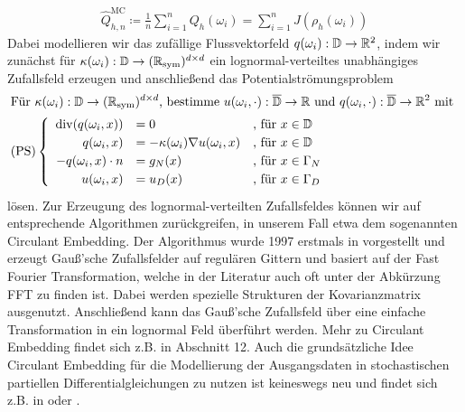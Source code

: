\begin{align}
	\label{MC-Schätzer}
	\widehat{Q}_{h,n}^{\text{MC}} \coloneqq \frac{1}{n} \sum_{i=1}^{n} Q_h(\omega_i) = \sum_{i=1}^{n} J(\rho_h(\omega_i))
\end{align}
Dabei modellieren wir das zufällige Flussvektorfeld $ q(\omega_i)  : \mathbb{D} \to \mathbb{R}^2 $, indem wir zunächst für $ \kappa(\omega_i) : \mathbb{D} \rightarrow (\mathbb{R}_{\text{sym}})^{d \times d} $ ein lognormal-verteiltes unabhängiges Zufallsfeld erzeugen und anschließend das Potentialströmungsproblem
\begin{align*}
\setlength\arraycolsep{1pt}
&\text{Für } \kappa(\omega_i) : \mathbb{D} \rightarrow (\R_{\text{sym}})^{d \times d} \text{, bestimme } u(\omega_i,\cdot):\overline{\mathbb{D}} \to \R \text{ und } q(\omega_i, \cdot): \overline{\mathbb{D}} \to \R^2 \text{ mit } \\
&\text{(PS)}
\begin{cases}
\begin{array}{rlll}
\dive (q(\omega_i,x)) &= 0  &\text{, für } x \in \mathbb{ D}\\  
q(\omega_i,x) &= - \kappa(\omega_i) \nabla u(\omega_i,x)  &\text{, für } x \in \mathbb{D}\\
-q(\omega_i,x) \cdot n &= g_N(x)  &\text{, für } x \in \Gamma_N \\
u(\omega_i,x) &= u_D(x)  &\text{, für } x \in \Gamma_D \\
\end{array}
\end{cases} \\
\end{align*}
lösen. Zur Erzeugung des lognormal-verteilten Zufallsfeldes können wir auf entsprechende Algorithmen zurückgreifen, in unserem Fall etwa dem sogenannten Circulant Embedding.
Der Algorithmus wurde 1997 erstmals in \cite{dietrich1997fast} vorgestellt und 
erzeugt Gauß'sche Zufallsfelder auf regulären Gittern und basiert auf der Fast Fourier Transformation, welche in der Literatur auch oft unter der Abkürzung FFT zu finden ist.
Dabei werden spezielle Strukturen der Kovarianzmatrix ausgenutzt. Anschließend kann das Gauß'sche Zufallsfeld über eine einfache Transformation in ein lognormal Feld überführt werden. Mehr zu Circulant Embedding findet sich z.B. in \cite{schmidt2014stochastic} Abschnitt 12.
Auch die grundsätzliche Idee Circulant Embedding für die Modellierung der Ausgangsdaten in stochastischen partiellen Differentialgleichungen zu nutzen ist keineswegs neu und findet sich z.B. in \cite{charrier2012strong} oder \cite{cliffe2011multilevel}.
